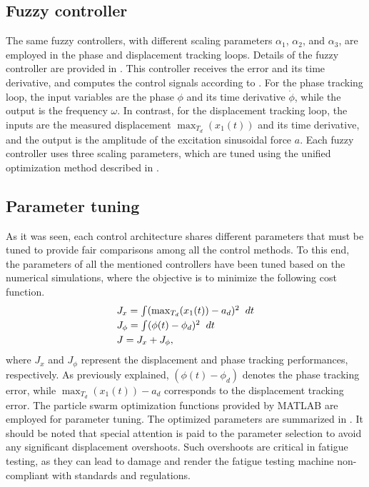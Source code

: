 \documentclass[lettersize,journal]{IEEEtran}
\begin{document}
\subsection{Fuzzy controller} \label{S_designed_fuzzy}

The same fuzzy controllers, with different scaling parameters $\alpha_1$, $\alpha_2$, and $\alpha_3$, are employed in the phase and displacement tracking loops. Details of the fuzzy controller are provided in . This controller receives the error and its time derivative, and computes the control signals according to . For the phase tracking loop, the input variables are the phase $\phi$ and its time derivative $\dot{\phi}$, while the output is the frequency $\omega$. In contrast, for the displacement tracking loop, the inputs are the measured displacement $\max_{T_d}(x_1(t))$ and its time derivative, and the output is the amplitude of the excitation sinusoidal force $a$. Each fuzzy controller uses three scaling parameters, which are tuned using the unified optimization method described in .


\subsection{Parameter tuning} \label{S_tuning}

As it was seen, each control architecture shares different parameters that must be tuned to provide fair comparisons among all the control methods. To this end, the parameters of all the mentioned controllers have been tuned based on the numerical simulations, where the objective is to minimize the following cost function.
\begin{equation}
\begin{array}{l}
J_x=\int (\max_{T_d}(x_1(t))-a_d)^2 \hspace{0.2cm}  dt \vspace{0.1cm} \\
J_\phi=\int  (\phi(t)-\phi_d)^2  \hspace{0.2cm}  dt \vspace{0.1cm}  \\
J=J_x+J_\phi ,
\end{array}
\label{E_objective}
\end{equation}
where $J_x$ and $J_\phi$ represent the displacement and phase tracking performances, respectively. As previously explained, $(\phi(t) - \phi_d)$ denotes the phase tracking error, while $\max_{T_d}(x_1(t)) - a_d$ corresponds to the displacement tracking error. The {\selectfont particle swarm optimization} functions provided by {\selectfont MATLAB} are employed for parameter tuning. The optimized parameters are summarized in . It should be noted that special attention is paid to the parameter selection to avoid any significant displacement overshoots. Such overshoots are critical in fatigue testing, as they can lead to damage and render the fatigue testing machine non-compliant with standards and regulations.
\end{document}
